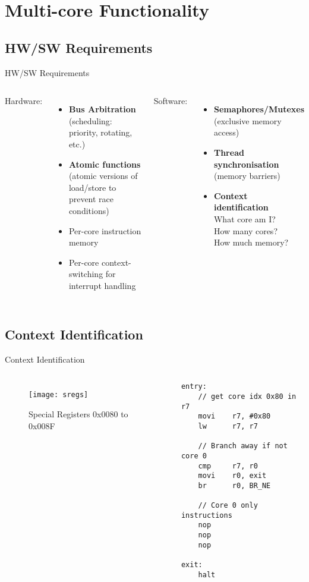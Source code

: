 \documentclass[aspectratio=169]{beamer}
\begin{document}
\section{Multi-core Functionality}
\frame{\vspace{-1cm}\tableofcontents[currentsection, subsectionstyle=show/show/hide]}
\subsection{HW/SW Requirements}
\begin{frame}{HW/SW Requirements}
\begin{columns}[t]
Hardware:
\begin{itemize}[<+->]
    \item \textbf{Bus Arbitration}\\ (scheduling: priority, rotating, etc.)
    \item \textbf{Atomic functions}\\ (atomic versions of load/store to prevent race conditions)
    \item Per-core instruction memory
    \item Per-core context-switching for interrupt handling
\end{itemize}
Software:
\begin{itemize}[<+->]
    \item \textbf{Semaphores/Mutexes}\\ (exclusive memory access)
    \item \textbf{Thread synchronisation}\\ (memory barriers)
    \item \textbf{Context identification}\\ What core am I?\\ How many cores?\\ How much memory?
\end{itemize}
\end{columns}
\end{frame}

\subsection{Context Identification}
\begin{frame}[fragile]{Context Identification}
\begin{columns}
\begin{figure}
\texttt{[image: sregs]}
\caption{Special Registers 0x0080 to 0x008F}
\end{figure}
\begin{lstlisting}
entry:
    // get core idx 0x80 in r7
    movi    r7, #0x80
    lw      r7, r7

    // Branch away if not core 0
    cmp     r7, r0
    movi    r0, exit
    br      r0, BR_NE 
    
    // Core 0 only instructions
    nop
    nop
    nop
    
exit:
    halt  
\end{lstlisting}
\end{columns}
\end{frame}
\end{document}
